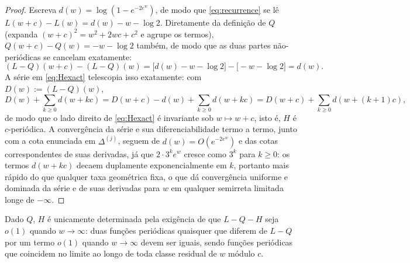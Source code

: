 \documentclass[11pt]{amsart}
\theoremstyle{plain}
\theoremstyle{definition}
\theoremstyle{remark}
\begin{document}
\begin{proof}
Escreva $d(w) = \log(1-e^{-2e^w})$, de modo que \eqref{eq:recurrence} se lê $L(w+c)-L(w) = d(w) - w
- \log 2$. Diretamente da definição de $Q$ (expanda $(w+c)^2 = w^2+2wc+c^2$ e agrupe os termos),
$Q(w+c)-Q(w) = -w-\log2$ também, de modo que as duas partes não-periódicas se cancelam exatamente:
\[
(L-Q)(w+c) - (L-Q)(w) = \bigl[d(w)-w-\log2\bigr] - \bigl[-w-\log2\bigr] = d(w).
\]
A série em \eqref{eq:Hexact} telescopia isso exatamente: com $D(w) := (L-Q)(w)$,
\[
D(w) + \sum_{k\ge0} d(w+kc) = D(w+c) - d(w) + \sum_{k\ge0}d(w+kc) = D(w+c) + \sum_{k\ge0}d(w+(k+1)c),
\]
de modo que o lado direito de \eqref{eq:Hexact} é invariante sob $w \mapsto w+c$, isto é, $H$ é
$c$-periódica. A convergência da série e sua diferenciabilidade termo a termo, junto com a cota
enunciada em $\Delta^{(j)}$, seguem de $d(w) = O(e^{-2e^w})$ e das cotas correspondentes de suas
derivadas, já que $2\cdot3^k e^w$ cresce como $3^k$ para $k\ge0$: os termos $d(w+kc)$ decaem
duplamente exponencialmente em $k$, portanto mais rápido do que qualquer taxa geométrica fixa, o
que dá convergência uniforme e dominada da série e de suas derivadas para $w$ em qualquer semirreta
limitada longe de $-\infty$.
\end{proof}

Dado $Q$, $H$ é unicamente determinada pela exigência de que $L-Q-H$ seja $o(1)$ quando $w\to\infty$:
duas funções periódicas quaisquer que diferem de $L-Q$ por um termo $o(1)$ quando $w\to\infty$ devem
ser iguais, sendo funções periódicas que coincidem no limite ao longo de toda classe residual de $w$
módulo $c$.
\end{document}
